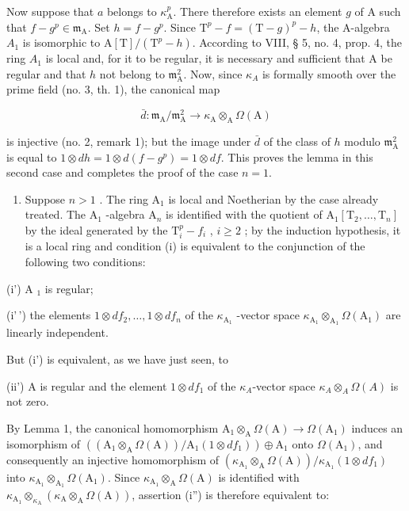Now suppose that \(a\) belongs to \(\kappa_{\mathrm{A}}^{p}\). There therefore exists an element \(g\) of A such that \(f - g^{p} \in \mathfrak{m}_{\mathrm{A}}\). Set \(h = f - g^{p}\). Since \(\mathrm{T}^{p} - f = (\mathrm{T} - g)^{p} - h\), the A-algebra \(A_{1}\) is isomorphic to \(\mathrm{A}[\mathrm{T}] / (\mathrm{T}^{p} - h)\). According to VIII, § 5, no. 4, prop. 4, the ring \(A_{1}\) is local and, for it to be regular, it is necessary and sufficient that A be regular and that \(h\) not belong to \(\mathfrak{m}_{\mathrm{A}}^{2}\). Now, since \(\kappa_{A}\) is formally smooth over the prime field (no. 3, th. 1), the canonical map

\[
\bar {d}: \mathfrak {m} _ {\mathrm{A}} / \mathfrak {m} _ {\mathrm{A}} ^ {2} \to \kappa_ {\mathrm{A}} \otimes_ {\mathrm{A}} \Omega (\mathrm{A})
\]

is injective (no. 2, remark 1); but the image under \(\bar{d}\) of the class of \(h\) modulo \(\mathfrak{m}_{\mathrm{A}}^{2}\) is equal to \(1 \otimes dh = 1 \otimes d(f - g^{p}) = 1 \otimes df\). This proves the lemma in this second case and completes the proof of the case \(n = 1\).

\begin{enumerate}
\def\labelenumi{\Alph{enumi})}
\setcounter{enumi}{1}
\tightlist
\item
  Suppose \(n > 1\) . The ring \(\mathrm{A}_{1}\) is local and Noetherian by the case already treated. The \(\mathrm{A}_{1}\) -algebra \(\mathrm{A}_{n}\) is identified with the quotient of \(\mathrm{A}_{1}[\mathrm{T}_{2},\ldots ,\mathrm{T}_{n}]\) by the ideal generated by the \(\mathrm{T}_i^p -f_i\) , \(i\geqslant 2\) ; by the induction hypothesis, it is a local ring and condition (i) is equivalent to the conjunction of the following two conditions:
\end{enumerate}

(i') A \(_{1}\) is regular;

(i'\,') the elements \(1 \otimes df_2, \ldots, 1 \otimes df_n\) of the \(\kappa_{\mathrm{A}_1}\) -vector space \(\kappa_{\mathrm{A}_1} \otimes_{\mathrm{A}_1} \Omega(\mathrm{A}_1)\) are linearly independent.

But (i') is equivalent, as we have just seen, to

(ii') A is regular and the element \(1 \otimes df_{1}\) of the \(\kappa_{A}\)-vector space \(\kappa_{A} \otimes_{A} \Omega(A)\) is not zero.

By Lemma 1, the canonical homomorphism \(\mathrm{A}_{1} \otimes_{\mathrm{A}} \Omega(\mathrm{A}) \to \Omega(\mathrm{A}_{1})\) induces an isomorphism of \(((\mathrm{A}_{1} \otimes_{\mathrm{A}} \Omega(\mathrm{A})) / \mathrm{A}_{1}(1 \otimes df_{1})) \oplus \mathrm{A}_{1}\) onto \(\Omega(\mathrm{A}_{1})\), and consequently an injective homomorphism of \((\kappa_{\mathrm{A}_{1}} \otimes_{\mathrm{A}} \Omega(\mathrm{A})) / \kappa_{\mathrm{A}_{1}}(1 \otimes df_{1})\) into \(\kappa_{\mathrm{A}_{1}} \otimes_{\mathrm{A}_{1}} \Omega(\mathrm{A}_{1})\). Since \(\kappa_{\mathrm{A}_{1}} \otimes_{\mathrm{A}} \Omega(\mathrm{A})\) is identified with \(\kappa_{\mathrm{A}_{1}} \otimes_{\kappa_{\mathrm{A}}} (\kappa_{\mathrm{A}} \otimes_{\mathrm{A}} \Omega(\mathrm{A}))\), assertion (i'') is therefore equivalent to:

